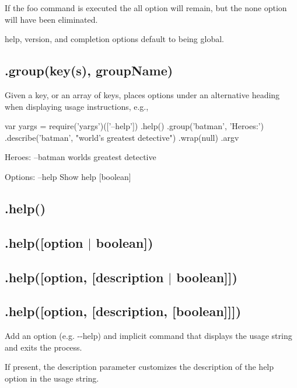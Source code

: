 If the {\ttfamily foo} command is executed the {\ttfamily all} option will remain, but the {\ttfamily none} option will have been eliminated.

{\ttfamily help}, {\ttfamily version}, and {\ttfamily completion} options default to being global.

\subsection*{\label{_group}%
.group(key(s), group\+Name) }

Given a key, or an array of keys, places options under an alternative heading when displaying usage instructions, e.\+g.,


\begin{DoxyCode}
var yargs = require('yargs')(['--help'])
  .help()
  .group('batman', 'Heroes:')
  .describe('batman', "world's greatest detective")
  .wrap(null)
  .argv
\end{DoxyCode}
 

 Heroes\+: --batman world\textquotesingle{}s greatest detective

Options\+: --help Show help \mbox{[}boolean\mbox{]}

\subsection*{\label{_help}%
.help() }

\subsection*{.help(\mbox{[}option $\vert$ boolean\mbox{]}) }

\subsection*{.help(\mbox{[}option, \mbox{[}description $\vert$ boolean\mbox{]}\mbox{]}) }

\subsection*{.help(\mbox{[}option, \mbox{[}description, \mbox{[}boolean\mbox{]}\mbox{]}\mbox{]}) }

Add an option (e.\+g. {\ttfamily -\/-\/help}) and implicit command that displays the usage string and exits the process.

If present, the {\ttfamily description} parameter customizes the description of the help option in the usage string.

